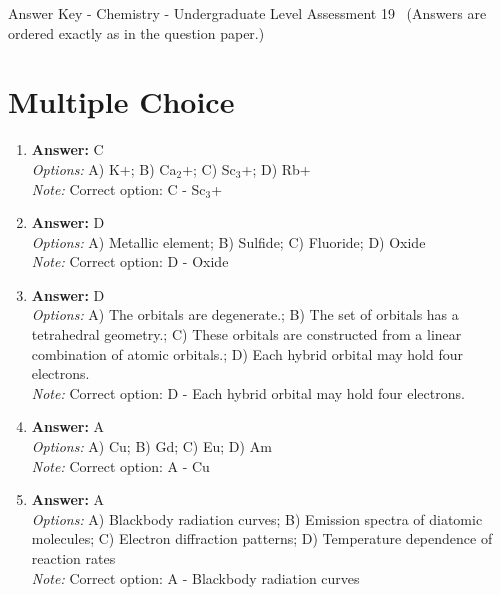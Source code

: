 \documentclass[12pt]{article}
\begin{document}
\begin{center}
Answer Key - Chemistry - Undergraduate Level Assessment 19 \
\small (Answers are ordered exactly as in the question paper.)
\end{center}

\section*{Multiple Choice}
\begin{enumerate}[label=\arabic*.]
\item \textbf{Answer:} C
\\ \textit{Options:} A) K+; B) Ca$_{2}$+; C) Sc$_{3}$+; D) Rb+
\\ \textit{Note:} Correct option: C - Sc$_{3}$+
\item \textbf{Answer:} D
\\ \textit{Options:} A) Metallic element; B) Sulfide; C) Fluoride; D) Oxide
\\ \textit{Note:} Correct option: D - Oxide
\item \textbf{Answer:} D
\\ \textit{Options:} A) The orbitals are degenerate.; B) The set of orbitals has a tetrahedral geometry.; C) These orbitals are constructed from a linear combination of atomic orbitals.; D) Each hybrid orbital may hold four electrons.
\\ \textit{Note:} Correct option: D - Each hybrid orbital may hold four electrons.
\item \textbf{Answer:} A
\\ \textit{Options:} A) Cu; B) Gd; C) Eu; D) Am
\\ \textit{Note:} Correct option: A - Cu
\item \textbf{Answer:} A
\\ \textit{Options:} A) Blackbody radiation curves; B) Emission spectra of diatomic molecules; C) Electron diffraction patterns; D) Temperature dependence of reaction rates
\\ \textit{Note:} Correct option: A - Blackbody radiation curves
\end{enumerate}
\end{document}
